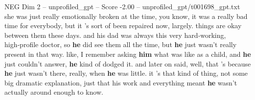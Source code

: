 \begin{textsample}{NEG Dim 2 – unprofiled\_gpt – Score -2.00 – unprofiled\_gpt/t001698\_gpt.txt}  \label{ex:f2_neg_026}
she was just really emotionally broken at the time, you know, it was a really bad time for everybody, but it ’s sort of been repaired now, largely. things are okay between them these days. and his dad was always this very hard‑working, high‑profile doctor, so \textbf{he} did see them all the time, but \textbf{he} just wasn't really present in that way. like, I remember asking \textbf{him} what was like as a child, and \textbf{he} just couldn't answer, \textbf{he} kind of dodged it. and later on said, well, that ’s because \textbf{he} just wasn't there, really, when \textbf{he} was little. it ’s that kind of thing, not some big dramatic explanation, just that his work and everything meant \textbf{he} wasn't actually around enough to know.

\end{textsample}
